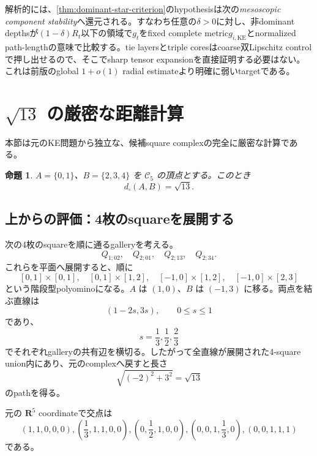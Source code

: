 \documentclass[11pt,a4paper]{ltjsarticle}
\newtheorem{proposition}[theorem]{命題}
\theoremstyle{definition}
\theoremstyle{remark}
\newcommand{\RR}{\mathbf R}
\newcommand{\cC}{\mathcal C}
\begin{document}
解析的には、\cref{thm:dominant-star-criterion}のhypothesisは次の\emph{mesoscopic component stability}へ還元される。すなわち任意の$\delta>0$に対し、非dominant depthsが$(1-\delta)R_t$以下の領域で$g_t$をfixed complete metric$g_{i,\mathrm{KE}}$とnormalized path-lengthの意味で比較する。tie layersとtriple coresはcoarse双Lipschitz controlで押し出せるので、そこでsharp tensor expansionを直接証明する必要はない。これは前版のglobal $1+o(1)$ radial estimateより明確に弱いtargetである。

\section{$\sqrt{13}$ の厳密な距離計算}

本節は元のKE問題から独立な、候補square complexの完全に厳密な計算である。

\begin{proposition}\label{prop:sqrt13}
$A=\{0,1\}$、$B=\{2,3,4\}$ を $\cC_5$ の頂点とする。このとき
\begin{equation}\label{eq:sqrt13distance}
 d_{\square}(A,B)=\sqrt{13}.
\end{equation}
\end{proposition}

\subsection{上からの評価：4枚のsquareを展開する}

次の4枚のsquareを順に通るgalleryを考える。
\begin{equation}\label{eq:gallery}
 Q_{1;02},\quad Q_{2;01},\quad Q_{2;13},\quad Q_{2;34}.
\end{equation}
これらを平面へ展開すると、順に
\[
 [0,1]\times[0,1],\quad
 [0,1]\times[1,2],\quad
 [-1,0]\times[1,2],\quad
 [-1,0]\times[2,3]
\]
という階段型polyominoになる。$A$ は $(1,0)$、$B$ は $(-1,3)$ に移る。両点を結ぶ直線は
\[
 (1-2s,3s),\qquad0\leq s\leq1
\]
であり、
\[
 s=\frac13,\frac12,\frac23
\]
でそれぞれgalleryの共有辺を横切る。したがって全直線が展開された4-square union内にあり、元のcomplexへ戻すと長さ
\begin{equation}\label{eq:upper13}
 \sqrt{(-2)^2+3^2}=\sqrt{13}
\end{equation}
のpathを得る。

元の $\RR^5$ coordinateで交点は
\[
 (1,1,0,0,0),
 \left(\frac13,1,1,0,0\right),
 \left(0,\frac12,1,0,0\right),
 \left(0,0,1,\frac13,0\right),
 (0,0,1,1,1)
\]
である。
\end{document}
